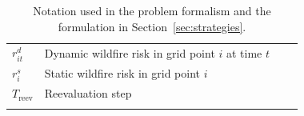 \begin{table}[!htb]
{\begin{tabular}{ll|ll}
$r_{it}^d$ & Dynamic wildfire risk in grid point $i$ at time $t$ &    \\
$r_i^s$ & Static wildfire risk in grid point $i$ \\
$T_{\text{reev}}$ & Reevaluation step \\
\bottomrule \addlinespace
\end{tabular}}
\caption{Notation used in the problem formalism and the formulation in Section~\ref{sec:strategies}.}
\label{tab:sets}
\end{table}
